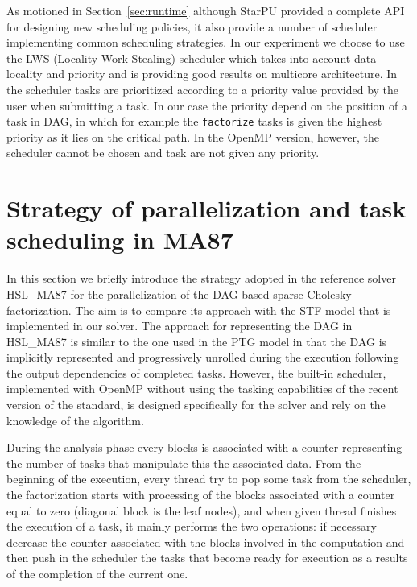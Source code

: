 \documentclass{article}
\newcommand{\starpu}{{StarPU}\xspace}
\newcommand{\openmp}{OpenMP\xspace}
\newcommand{\ma}{HSL\_MA87\xspace}
\newcommand{\lsection}[1]{\section{#1} \setcounter{equation}{0} \setcounter{figure}{0} \setcounter{table}{0} \label{#1}}
\begin{document}
As motioned in Section~\ref{sec:runtime} although \starpu provided a
complete API for designing new scheduling policies, it also provide a
number of scheduler implementing common scheduling strategies. In our
experiment we choose to use the LWS (Locality Work Stealing) scheduler
which takes into account data locality and priority and is providing
good results on multicore architecture. In the scheduler tasks are
prioritized according to a priority value provided by the user when
submitting a task. In our case the priority depend on the position of
a task in DAG, in which for example the \texttt{factorize} tasks is
given the highest priority as it lies on the critical path. In the
\openmp version, however, the scheduler cannot be chosen and task are
not given any priority.


\lsection{Strategy of parallelization and task scheduling in MA87}\label{sec:ma87}

In this section we briefly introduce the strategy adopted in the
reference solver \ma for the parallelization of the DAG-based sparse
Cholesky factorization. The aim is to compare its approach with the
STF model that is implemented in our solver. The approach for
representing the DAG in \ma is similar to the one used in the PTG
model in that the DAG is implicitly represented and progressively
unrolled during the execution following the output dependencies of
completed tasks. However, the built-in scheduler, implemented with
OpenMP without using the tasking capabilities of the recent version of
the standard, is designed specifically for the solver and rely on the
knowledge of the algorithm.

During the analysis phase every blocks is associated with a counter
representing the number of tasks that manipulate this the associated
data. From the beginning of the execution, every thread try to pop
some task from the scheduler, the factorization starts with processing
of the blocks associated with a counter equal to zero (diagonal block
is the leaf nodes), and when given thread finishes the execution of a
task, it mainly performs the two operations: if necessary decrease the
counter associated with the blocks involved in the computation and
then push in the scheduler the tasks that become ready for execution
as a results of the completion of the current one. 
\end{document}
